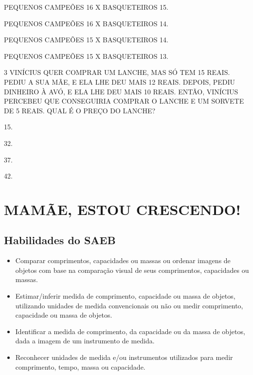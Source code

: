 \begin{escolha}
\item
  PEQUENOS CAMPEÕES 16 X BASQUETEIROS 15.
\item
  PEQUENOS CAMPEÕES 16 X BASQUETEIROS 14.
\item
  PEQUENOS CAMPEÕES 15 X BASQUETEIROS 14.
\item
  PEQUENOS CAMPEÕES 15 X BASQUETEIROS 13.
\end{escolha}

\pagebreak
\num{3} VINÍCIUS QUER COMPRAR UM LANCHE, MAS SÓ TEM 15 REAIS. PEDIU A SUA MÃE, E
ELA LHE DEU MAIS 12 REAIS. DEPOIS, PEDIU DINHEIRO À AVÓ, E ELA
LHE DEU MAIS 10 REAIS. ENTÃO, VINÍCIUS PERCEBEU QUE CONSEGUIRIA COMPRAR O LANCHE E UM SORVETE DE 5 REAIS. QUAL É O PREÇO DO LANCHE?

\begin{escolha}
\item
  15.
\item
  32.
\item
  37.
\item
  42.
\end{escolha}

\chapter{MAMÃE, ESTOU CRESCENDO!}


\section{Habilidades do SAEB}

\begin{itemize}
\item
  Comparar comprimentos, capacidades ou massas ou ordenar imagens de
  objetos com base na comparação visual de seus comprimentos,
  capacidades ou massas.
\item
  Estimar/inferir medida de comprimento, capacidade ou massa de objetos,
  utilizando unidades de medida convencionais ou não ou medir
  comprimento, capacidade ou massa de objetos.
\item
  Identificar a medida de comprimento, da capacidade ou da massa de
  objetos, dada a imagem de um instrumento de medida.
\item
  Reconhecer unidades de medida e/ou instrumentos utilizados para medir
  comprimento, tempo, massa ou capacidade.
\end{itemize}

